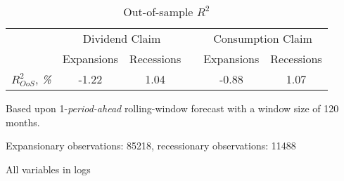 \begin{table}[H]
\centering
\caption{Out-of-sample $R^2$}
\label{tab:R2OS}
\begin{threeparttable}
\begin{tabular}{@{}lccccc@{}}
\toprule
                         & \multicolumn{2}{c}{Dividend Claim} && \multicolumn{2}{c}{Consumption Claim} \\ 
                         \addlinespace
& Expansions       & Recessions      && Expansions        & Recessions        \\
\cmidrule(lr){2-3} \cmidrule(lr){5-6}
$R^2_{OoS}$, \textit{\%} & -1.22            & 1.04            && -0.88             & 1.07              \\ \bottomrule
\end{tabular}
\begin{tablenotes}\footnotesize{
\item[1] Based upon 1-\textit{period-ahead} rolling-window forecast with a window size of 120 months.
\item[2] Expansionary observations: 85218, recessionary observations: 11488
\item[3] All variables in logs}
\end{tablenotes}
\end{threeparttable}
\end{table}